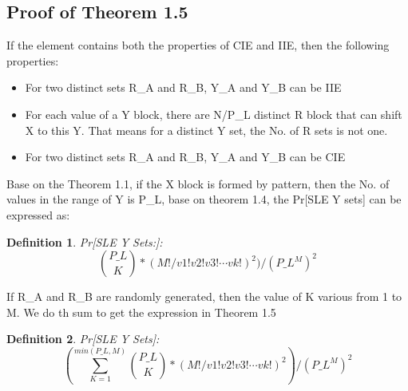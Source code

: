 \documentclass{article}
\newtheorem{defination}{Definition}[section]
\begin{document}
\subsection{Proof of Theorem 1.5}
If the element contains both the properties of CIE and IIE, then the following properties:
\begin{itemize}
	\item For two distinct sets R\_A and R\_B, Y\_A and Y\_B can be IIE
	\item For each value of a Y block, there are N/P\_L distinct R block that can shift X to this Y. That means for a distinct Y set, the No. of R sets is not one.
	\item For two distinct sets R\_A and R\_B, Y\_A and Y\_B can be CIE
\end{itemize}
Base on the Theorem 1.1, if the X block is formed by pattern, then the No. of values in the range of Y is P\_L, base on theorem 1.4, the Pr[SLE Y sets] can be expressed as:
\begin{defination}
Pr[SLE Y Sets:]:
\begin{displaymath}
\binom{P\_L}{K} * (M!/v1!v2!v3! \cdots vk!) ^ 2 )/(P\_L^M)^2
\end{displaymath}
\end{defination}

If R\_A and R\_B are randomly generated, then the value of K various from 1 to M. We do th sum to get the expression in Theorem 1.5
\begin{defination}
Pr[SLE Y Sets]:
\begin{displaymath}
(\sum_{K=1}^{min(P\_L,M)} \binom{P\_L}{K} * (M!/v1!v2!v3! \cdots vk!) ^ 2 )/(P\_L^M)^2
\end{displaymath}
\end{defination}
\end{document}
